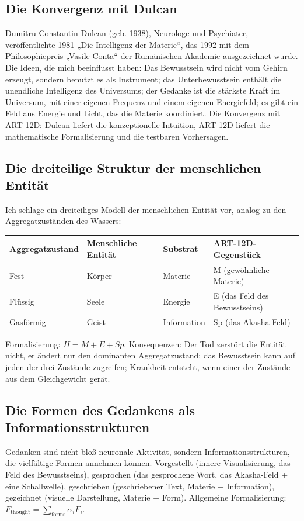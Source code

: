 \subsection{Die Konvergenz mit Dulcan}
Dumitru Constantin Dulcan (geb. 1938), Neurologe und Psychiater, veröffentlichte 1981 „Die Intelligenz der Materie``, das 1992 mit dem Philosophiepreis „Vasile Conta`` der Rumänischen Akademie ausgezeichnet wurde. Die Ideen, die mich beeinflusst haben: Das Bewusstsein wird nicht vom Gehirn erzeugt, sondern benutzt es als Instrument; das Unterbewusstsein enthält die unendliche Intelligenz des Universums; der Gedanke ist die stärkste Kraft im Universum, mit einer eigenen Frequenz und einem eigenen Energiefeld; es gibt ein Feld aus Energie und Licht, das die Materie koordiniert. Die Konvergenz mit ART-12D: Dulcan liefert die konzeptionelle Intuition, ART-12D liefert die mathematische Formalisierung und die testbaren Vorhersagen.

\subsection{Die dreiteilige Struktur der menschlichen Entität}
Ich schlage ein dreiteiliges Modell der menschlichen Entität vor, analog zu den Aggregatzuständen des Wassers:
\begin{table}[H]
\centering
\begin{tabular}{@{}llll@{}}
\toprule
\textbf{Aggregatzustand} & \textbf{Menschliche Entität} & \textbf{Substrat} & \textbf{ART-12D-Gegenstück} \\ \midrule
Fest & Körper & Materie & M (gewöhnliche Materie) \\
Flüssig & Seele & Energie & E (das Feld des Bewusstseins) \\
Gasförmig & Geist & Information & Sp (das Akasha-Feld) \\ \bottomrule
\end{tabular}
\end{table}
Formalisierung: $H = M + E + Sp$. Konsequenzen: Der Tod zerstört die Entität nicht, er ändert nur den dominanten Aggregatzustand; das Bewusstsein kann auf jeden der drei Zustände zugreifen; Krankheit entsteht, wenn einer der Zustände aus dem Gleichgewicht gerät.

\subsection{Die Formen des Gedankens als Informationsstrukturen}
Gedanken sind nicht bloß neuronale Aktivität, sondern Informationsstrukturen, die vielfältige Formen annehmen können. Vorgestellt (innere Visualisierung, das Feld des Bewusstseins), gesprochen (das gesprochene Wort, das Akasha-Feld + eine Schallwelle), geschrieben (geschriebener Text, Materie + Information), gezeichnet (visuelle Darstellung, Materie + Form). Allgemeine Formalisierung: $F_{\text{thought}} = \sum_{\text{forms}} \alpha_i F_i$.

